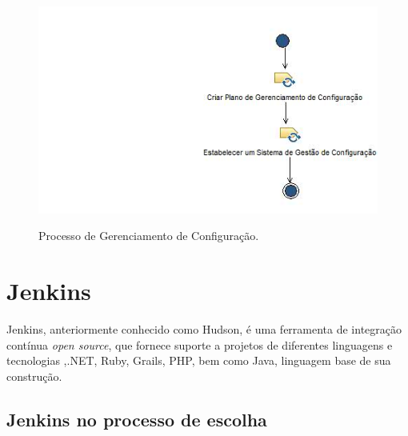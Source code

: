 \begin{figure}[h]
\centering
\caption[Processo de Gerenciamento de Configuração]{Processo de Gerenciamento de Configuração.}
\includegraphics[scale=0.7]{./images/processonpi}
\label{fig:procnpi}
\end{figure}

\section{Jenkins}
Jenkins, anteriormente conhecido como Hudson, é uma ferramenta de integração contínua \textit{open source}, que fornece suporte a projetos de diferentes linguagens e tecnologias ,.NET, Ruby, Grails, PHP, bem como Java, linguagem base de sua construção. \cite{smart2011}

\subsection{Jenkins no processo de escolha}\label{jenkinsEscolha}

